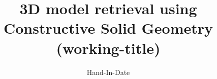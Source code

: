 \documentclass[a4paper, 10pt, oneside]{memoir}
\title				{3D model retrieval using Constructive Solid Geometry (working-title)}
\date				{\todoMissing{Date} Hand-In-Date}
\begin{document}

\thesisfront
\maketitle
\pagestyle{thesis}
% 

\thesistoc
\thesismain






\thesisappendix
\thesisbib
\begin{appendices}
	 
\end{appendices}
\thesisback

\end{document}
